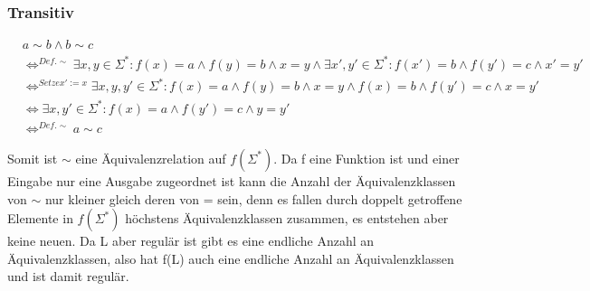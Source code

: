 \documentclass[12pt, a4paper]{article}
\begin{document}
\subsubsection*{Transitiv}
\begin{align*}
&a \sim b \wedge b \sim c \\
&\Longleftrightarrow^{Def. \sim} \exists x,y \in \Sigma^*:  f(x) = a \wedge f(y) = b \wedge x = y \wedge \exists x',y' \in \Sigma^*:  f(x') = b \wedge f(y') = c \wedge x' = y' \\ 
&\Longleftrightarrow^{Setze x' := x} \exists x,y,y' \in \Sigma^*:  f(x) = a \wedge f(y) = b \wedge x = y \wedge  f(x) = b \wedge f(y') = c \wedge x = y' \\ 
&\Longleftrightarrow \exists x,y' \in \Sigma^*:  f(x) = a  \wedge f(y') = c \wedge y = y' \\
&\Longleftrightarrow^{Def. \sim} a \sim c
\end{align*}

Somit ist $\sim$ eine Äquivalenzrelation auf $f(\Sigma^*)$. Da f eine Funktion ist und einer Eingabe nur eine Ausgabe zugeordnet ist kann die Anzahl der Äquivalenzklassen von $\sim$ nur kleiner gleich deren von = sein, denn es fallen durch doppelt getroffene Elemente in $f(\Sigma^*)$ höchstens Äquivalenzklassen zusammen, es entstehen aber keine neuen. Da L aber regulär ist gibt es eine endliche Anzahl an Äquivalenzklassen, also hat f(L) auch eine endliche Anzahl an Äquivalenzklassen und ist damit regulär.
\end{document}
